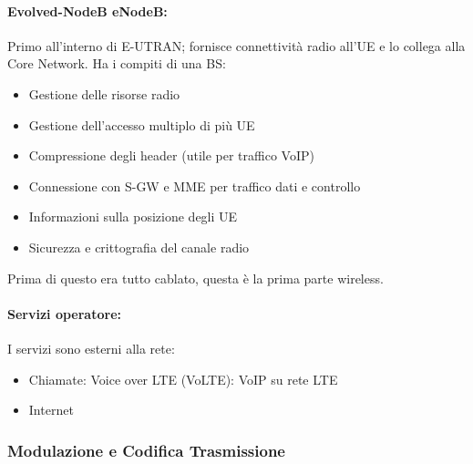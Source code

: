 \paragraph{Evolved-NodeB eNodeB:} Primo all'interno di E-UTRAN; fornisce connettività radio all'UE e lo collega alla Core Network. Ha i compiti di una BS:
\begin{itemize}
	\item Gestione delle risorse radio
	\item Gestione dell'accesso multiplo di più UE
	\item Compressione degli header (utile per traffico VoIP)
	\item Connessione con S-GW e MME per traffico dati e controllo
	\item Informazioni sulla posizione degli UE
	\item Sicurezza e crittografia del canale radio
\end{itemize}
Prima di questo era tutto cablato, questa è la prima parte wireless.\\

\paragraph{Servizi operatore:} I servizi sono esterni alla rete: 
\begin{itemize}
	\item Chiamate: Voice over LTE (VoLTE): VoIP su rete LTE
	\item Internet
\end{itemize}

\subsubsection{Modulazione e Codifica Trasmissione}

